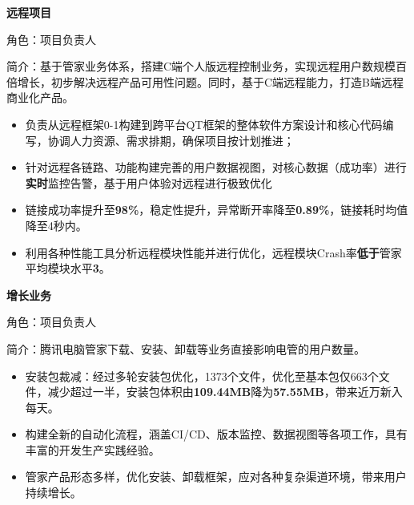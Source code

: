 \documentclass{resume}
\begin{document}
{\textbf{\large{远程项目}}}
\vspace{0.5ex}
\par{角色：项目负责人}
\vspace{0.3ex}
\par{简介：基于管家业务体系，搭建C端个人版远程控制业务，实现远程用户数规模百倍增长，初步解决远程产品可用性问题。同时，基于C端远程能力，打造B端远程商业化产品。}
\begin{itemize}[itemsep=0.4em]
  \item 负责从远程框架0-1构建到跨平台QT框架的整体软件方案设计和核心代码编写，协调人力资源、需求排期，确保项目按计划推进；
  \item 针对远程各链路、功能构建完善的用户数据视图，对核心数据（成功率）进行\textbf{实时}监控告警，基于用户体验对远程进行极致优化
  \item 链接成功率提升至\textbf{98\%}，稳定性提升，异常断开率降至\textbf{0.89\%}，链接耗时均值降至4秒内。
  \item 利用各种性能工具分析远程模块性能并进行优化，远程模块Crash率\textbf{低于}管家平均模块水平\textbf{3\textperthousand}。
\end{itemize}

\vspace{1.0ex}
{\textbf{\large{增长业务}}}
\vspace{0.3ex}
\par{角色：项目负责人}
\vspace{0.5ex}
\par{简介：腾讯电脑管家下载、安装、卸载等业务直接影响电管的用户数量。}
\begin{itemize}[itemsep=0.4em]
  \item 安装包裁减：经过多轮安装包优化，1373个文件，优化至基本包仅663个文件，减少超过一半，安装包体积由\textbf{109.44MB}降为\textbf{57.55MB}，带来近万新入每天。
  \item 构建全新的自动化流程，涵盖CI/CD、版本监控、数据视图等各项工作，具有丰富的开发生产实践经验。
  \item 管家产品形态多样，优化安装、卸载框架，应对各种复杂渠道环境，带来用户持续增长。
\end{itemize}

\end{document}
